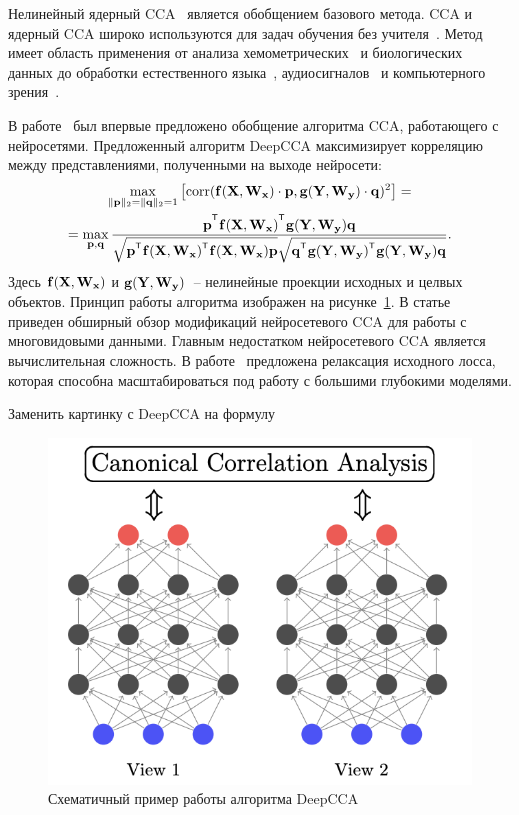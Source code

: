 Нелинейный ядерный CCA~\cite{akaho2006kernel,melzer2001nonlinear,bach2002kernel,hardoon2004canonical} является обобщением базового метода. 
CCA и ядерный CCA широко используются для задач обучения без учителя~\cite{hardoon2007unsupervised,vinokourov2003inferring}. 
Метод имеет область применения от анализа хемометрических~\cite{montanarella1995chemometric} и биологических~\cite{vert2003graph} данных до обработки естественного языка~\cite{haghighi2008learning,dhillon2011multi}, аудиосигналов~\cite{choukri1986adaptation,rudzicz2010adaptive} и компьютерного зрения~\cite{kim2007tensor}.

В работе~\cite{andrew2013deep} был впервые предложено обобщение алгоритма CCA, работающего с нейросетями. 
Предложенный алгоритм DeepCCA максимизирует корреляцию между представлениями, полученными на выходе нейросети:
\begin{multline}
	\max_{\|\bp\|_{2}=\|\bq\|_{2}=1}\left[ \text{corr}(\mathbf{f}(\bX, \bW_{\bx}) \cdot \bp, \mathbf{g}(\bY, \bW_{\by}) \cdot \bq)^{2}\right] = \\ = \max_{\bp, \bq} \frac{\bp^{\T} \mathbf{f}(\bX, \bW_{\bx})^{\T} \mathbf{g}(\bY, \bW_{\by}) \bq}{\sqrt{\bp^{\T} \mathbf{f}(\bX, \bW_{\bx})^{\T}  \mathbf{f}(\bX, \bW_{\bx}) \bp} \sqrt{\bq^{\T} \mathbf{g}(\bY, \bW_{\by})^{\T}  \mathbf{g}(\bY, \bW_{\by}) \bq}}.
	\label{ch1:eq:depp_cca_max_corr}
\end{multline}
Здесь $\mathbf{f}(\mathbf{X}, \mathbf{W}_{\mathbf{x}})$ и $\mathbf{g}(\mathbf{Y}, \mathbf{W}_{\mathbf{y}})$~-- нелинейные проекции исходных и целвых объектов.
Принцип работы алгоритма изображен на рисунке~\ref{ch1:fig:deepcca_schema}.
В статье~\cite{wang2015deep} приведен обширный обзор модификаций нейросетевого CCA для работы с многовидовыми данными.
Главным недостатком нейросетевого CCA является вычислительная сложность. 
В работе~\cite{chang2018scalable} предложена релаксация исходного лосса, которая способна масштабироваться под работу с большими глубокими моделями.

{\color{red} Заменить картинку с DeepCCA на формулу}

\begin{figure}[h]
	\centering
	\includegraphics[width=0.5\linewidth]{figs/ch1/deepcca_schema}
	\caption{Схематичный пример работы алгоритма DeepCCA~\cite{andrew2013deep}}
	\label{ch1:fig:deepcca_schema}
\end{figure}

